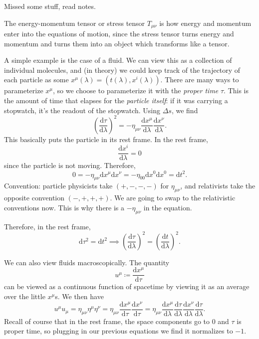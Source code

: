 
Missed some stuff, read notes.

The energy-momentum tensor or stress tensor $T_{\mu \nu } $ is how energy and momentum enter into the equations of motion, since the stress tensor turns energy and momentum and turns them into an object which transforms like a tensor.

A simple example is the case of a fluid. We can view this as a collection of individual molecules, and (in theory) we could keep track of the trajectory of each particle as some $x^\mu (\lambda )=(t(\lambda ),x^i(\lambda ))$. There are many ways to parameterize $x^\mu $, so we choose to parameterize it with the \emph{proper time} $\tau $. This is the amount of time that elapses for the \emph{particle itself}: if it was carrying a stopwatch, it's the readout of the stopwatch. Using $\Delta s$, we find
\[
	\left( \frac{\mathrm{d}\tau }{\mathrm{d}\lambda }  \right) ^2=-\eta _{\mu \nu } \frac{\mathrm{d}x^\mu }{\mathrm{d}\lambda } \frac{\mathrm{d}x^\nu }{\mathrm{d}\lambda } 
.\]
This basically puts the particle in its rest frame. In the rest frame,
\[
	\frac{\mathrm{d}x^i}{\mathrm{d}\lambda } =0
\]
since the particle is not moving. Therefore,
\[
	0=-\eta _{\mu \nu } \mathrm{d} x^\mu \mathrm{d} x^\nu =-\eta _{00} \mathrm{d} x^0\mathrm{d} x^0=\mathrm{d} t^2
.\]
Convention: particle physicists take $(+,-,-,-)$ for $\eta _{\mu \nu } $, and relativists take the opposite convention $(-,+,+,+)$. We are going to swap to the relativistic conventions now. This is why there is a $-\eta _{\mu \nu } $ in the equation.

Therefore, in the rest frame,
\[
	\mathrm{d} \tau ^2=\mathrm{d} t^2 \implies \left(\frac{\mathrm{d}\tau }{\mathrm{d}\lambda }\right)^2 =\left(\frac{\mathrm{d}t}{\mathrm{d}\lambda } \right)^2.
\]

We can also view fluids macroscopically. The quantity
\[
	u^\mu \coloneqq \frac{\mathrm{d}x^\mu }{\mathrm{d}\tau } 
\]
can be viewed as a continuous function of spacetime by viewing it as an average over the little $x^\mu $s. We then have
\[
	u^\mu u_\mu =\eta _{\mu \nu } \eta ^\mu \eta ^\nu =\eta _{\mu \nu } \frac{\mathrm{d}x^\mu }{\mathrm{d}\tau } \frac{\mathrm{d}x^\nu }{\mathrm{d}\tau } =\eta _{\mu \nu } \frac{\mathrm{d}x^\mu }{\mathrm{d}\lambda } \frac{\mathrm{d}\tau  }{\mathrm{d}\lambda  } \frac{\mathrm{d}x^\nu }{\mathrm{d}\lambda  } \frac{\mathrm{d}\tau  }{\mathrm{d}\lambda  } 
.\]
Recall of course that in the rest frame, the space components go to 0 and $\tau $ is proper time, so plugging in our previous equations we find it normalizes to $-1$.

